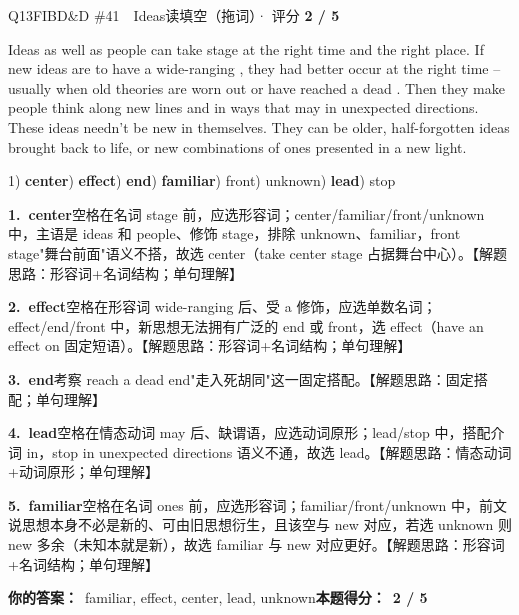 \begin{qblock}{Q13\quad FIBD\&D \#41\ \ Ideas}{读填空（拖词）· 评分 \textcolor{cAccent}{\bfseries 2 / 5}}
\begin{promptbox}
Ideas as well as people can take  stage at the right time and the right place. If new ideas are to have a wide-ranging , they had better occur at the right time -- usually when old theories are worn out or have reached a dead . Then they make people think along new lines and in ways that may  in unexpected directions. These ideas needn't be new in themselves. They can be older, half-forgotten ideas brought back to life, or new combinations of  ones presented in a new light.
\end{promptbox}
{\small 1) \textbf{center}) \textbf{effect}) \textbf{end}) \textbf{familiar}) front) unknown) \textbf{lead}) stop}
\begin{notebox}\footnotesize
\textbf{1.\ center}\quad 空格在名词 stage 前，应选形容词；center/familiar/front/unknown 中，主语是 ideas 和 people、修饰 stage，排除 unknown、familiar，front stage"舞台前面"语义不搭，故选 center（take center stage 占据舞台中心）。【解题思路：形容词+名词结构；单句理解】\par\smallskip
\textbf{2.\ effect}\quad 空格在形容词 wide-ranging 后、受 a 修饰，应选单数名词；effect/end/front 中，新思想无法拥有广泛的 end 或 front，选 effect（have an effect on 固定短语）。【解题思路：形容词+名词结构；单句理解】\par\smallskip
\textbf{3.\ end}\quad 考察 reach a dead end"走入死胡同"这一固定搭配。【解题思路：固定搭配；单句理解】\par\smallskip
\textbf{4.\ lead}\quad 空格在情态动词 may 后、缺谓语，应选动词原形；lead/stop 中，搭配介词 in，stop in unexpected directions 语义不通，故选 lead。【解题思路：情态动词+动词原形；单句理解】\par\smallskip
\textbf{5.\ familiar}\quad 空格在名词 ones 前，应选形容词；familiar/front/unknown 中，前文说思想本身不必是新的、可由旧思想衍生，且该空与 new 对应，若选 unknown 则 new 多余（未知本就是新），故选 familiar 与 new 对应更好。【解题思路：形容词+名词结构；单句理解】
\end{notebox}
\smallskip
\textbf{你的答案：}\ {\color{cWrong}familiar}, effect, {\color{cWrong}center}, lead, {\color{cWrong}unknown}\qquad\textbf{本题得分：}\ {\color{cAccent}\bfseries 2 / 5}
\end{qblock}


